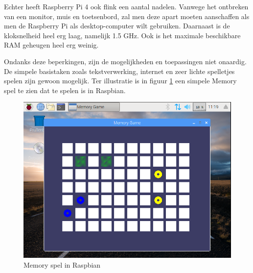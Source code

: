 \documentclass[a4paper, dutch, abstract=true]{scrartcl}
\begin{document}
Echter heeft Raspberry Pi 4 ook flink een aantal nadelen.
Vanwege het ontbreken van een monitor, muis en toetsenbord, zal men deze apart moeten aanschaffen
als men de Raspberry Pi als desktop-computer wilt gebruiken.
Daarnaast is de kloksnelheid heel erg laag, namelijk 1.5 GHz.
Ook is het maximale beschikbare RAM geheugen heel erg weinig.

Ondanks deze beperkingen, zijn de mogelijkheden en toepassingen niet onaardig.
De simpele basistaken zoals tekstverwerking, internet en zeer lichte spelletjes spelen zijn gewoon
mogelijk.
Ter illustratie is in figuur \ref{fig:raspbian-memory} een simpele Memory spel te zien dat te spelen
is in Raspbian.
\begin{figure}[h]
    \centering
    \includegraphics[scale=0.5]{raspbian-memory.png}
    \caption{Memory spel in Raspbian}
    \label{fig:raspbian-memory}
\end{figure}

\end{document}
